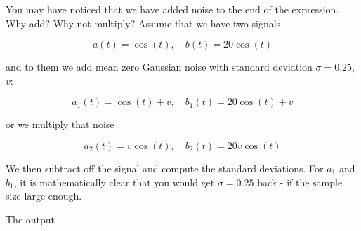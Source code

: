 You may have noticed that we have added noise to the end of the
expression. Why add? Why not multiply? Assume that we have two signals

\[a(t) = \cos(t) , \quad  b(t) = 20\cos(t)\]

and to them we add mean zero Gaussian noise with standard deviation
\(\sigma = 0.25\), \(v\):

\[a_1(t) = \cos(t) +v, \quad  b_1(t) = 20\cos(t) + v\]

or we multiply that noise

\[a_2(t) = v\cos(t), \quad  b_2(t) = 20v\cos(t)\]

We then subtract off the signal and compute the standard deviations. For
\(a_1\) and \(b_1\), it is mathematically clear that you would get
\(\sigma = 0.25\) back - if the sample size large enough.

\begin{Shaded}
\begin{Highlighting}[]
\OperatorTok{=}\OperatorTok{,}\OperatorTok{,}\OperatorTok{=}
\OperatorTok{=}
\OperatorTok{=}\OperatorTok{,} \NormalTok{)}\OperatorTok{,} \NormalTok{)}
\OperatorTok{=}\OperatorTok{+}
\OperatorTok{=}  \OperatorTok{*}\OperatorTok{+}
\OperatorTok{=}
\OperatorTok{=}  \OperatorTok{*}
\OperatorTok{=}\OperatorTok{{-}}
\OperatorTok{=}\OperatorTok{{-}}  \OperatorTok{*}
\OperatorTok{=}\OperatorTok{{-}}
\OperatorTok{=}\OperatorTok{{-}}  \OperatorTok{*}
\end{Highlighting}
\end{Shaded}

The output

\begin{Shaded}
\begin{Highlighting}[]
\OperatorTok{\textgreater{}}

\OperatorTok{\textgreater{}}

\OperatorTok{\textgreater{}}

\OperatorTok{\textgreater{}}
\end{Highlighting}
\end{Shaded}

